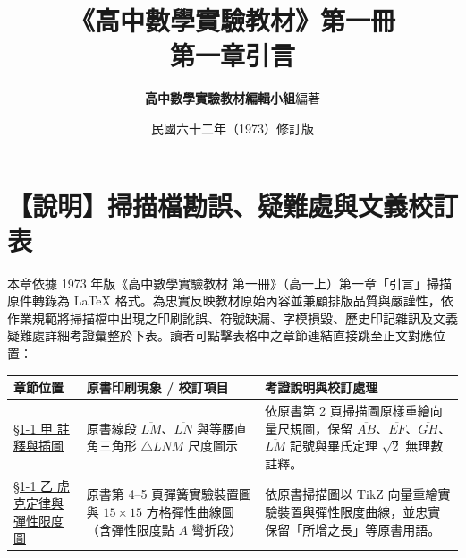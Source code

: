 \documentclass[a4paper,12pt,twoside]{article}
\title{\LARGE\textbf{《高中數學實驗教材》第一冊}\\[0.5em] \Large\textbf{第一章\quad 引言}}
\author{\textbf{高中數學實驗教材編輯小組}\quad 編著}
\date{民國六十二年（1973）修訂版}
\begin{document}
\maketitle
\thispagestyle{firstpage}

\section*{【說明】掃描檔勘誤、疑難處與文義校訂表}
\label{sec:errata_notes}

本章依據 1973 年版《高中數學實驗教材 第一冊》（高一上）第一章「引言」掃描原件轉錄為 \LaTeX{} 格式。為忠實反映教材原始內容並兼顧排版品質與嚴謹性，依作業規範將掃描檔中出現之印刷訛誤、符號缺漏、字模損毀、歷史印記雜訊及文義疑難處詳細考證彙整於下表。讀者可點擊表格中之章節連結直接跳至正文對應位置：

\begin{table}[H]
\centering
\small
\renewcommand{\arraystretch}{1.35}
\begin{tabularx}{\textwidth}{|p{3.2cm}|p{3.6cm}|X|}
\hline
\textbf{章節位置} & \textbf{原書印刷現象 / 校訂項目} & \textbf{考證說明與校訂處理} \\ \hline

\hyperref[fn:sqrt2]{\S 1-1 甲 註釋與插圖} & 
原書線段 $\overline{LM}$、$\overline{LN}$ 與等腰直角三角形 $\triangle LNM$ 尺度圖示 & 
依原書第 2 頁掃描圖原樣重繪向量尺規圖，保留 $\overline{AB}$、$\overline{EF}$、$\overline{GH}$、$\overline{LM}$ 記號與畢氏定理 $\sqrt{2}$ 無理數註釋。 \\ \hline

\hyperref[fig:elasticity]{\S 1-1 乙 虎克定律與彈性限度圖} & 
原書第 4--5 頁彈簧實驗裝置圖與 $15\times 15$ 方格彈性曲線圖（含彈性限度點 $A$ 彎折段） & 
依原書掃描圖以 TikZ 向量重繪實驗裝置與彈性限度曲線，並忠實保留「所增之長」等原書用語。 \\ \hline

\end{tabularx}
\end{table}

\clearpage
\tableofcontents
\newpage


\end{document}
